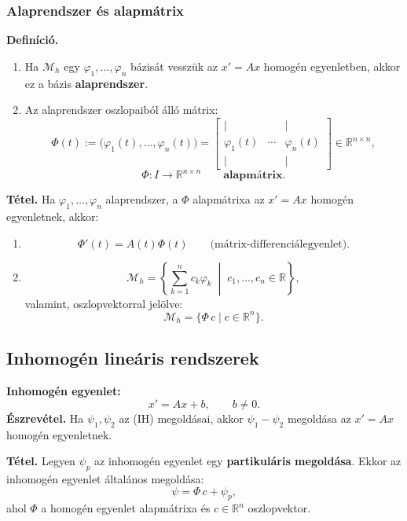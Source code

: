 \subsubsection*{Alaprendszer és alapmátrix}
\textbf{Definíció.}
\begin{enumerate}[label=\arabic*)]
\item Ha $\mathcal M_h$ egy $\varphi_1,\ldots,\varphi_n$ bázisát
vesszük az $x'=Ax$ homogén egyenletben, akkor ez a bázis
\textbf{alaprendszer}.
\item Az alaprendszer oszlopaiból álló mátrix:
\[
 \Phi(t):=\bigl(\varphi_1(t),\ldots,\varphi_n(t)\bigr)
 =\begin{bmatrix}\vert&&\vert\\
                   \varphi_1(t)&\cdots&\varphi_n(t)\\
                   \vert&&\vert\end{bmatrix}
 \in\mathbb R^{n\times n},
\]
\[
 \Phi:I\longrightarrow\mathbb R^{n\times n}
 \qquad\textbf{alapmátrix}.
\]
\end{enumerate}

\begin{matbox}
\textbf{Tétel.} Ha $\varphi_1,\ldots,\varphi_n$ alaprendszer,
a $\Phi$ alapmátrixa az $x'=Ax$ homogén egyenletnek, akkor:
\begin{enumerate}[label=\arabic*)]
\item
\[
 \Phi'(t)=A(t)\Phi(t)
 \qquad\text{(mátrix-differenciálegyenlet)}.
\]
\item
\[
 \mathcal M_h=\left\{\sum_{k=1}^{n}c_k\varphi_k
 \;\middle|\;c_1,\ldots,c_n\in\mathbb R\right\},
\]
valamint, oszlopvektorral jelölve:
\[
 \mathcal M_h=\{\Phi\,c\mid c\in\mathbb R^n\}.
\]
\end{enumerate}
\end{matbox}

\subsection{Inhomogén lineáris rendszerek}
\textbf{Inhomogén egyenlet:}
\[
 x'=Ax+b,\qquad b\ne0.\tag{IH}
\]
\textbf{Észrevétel.} Ha $\psi_1,\psi_2$ az (IH) megoldásai,
akkor $\psi_1-\psi_2$ megoldása az $x'=Ax$ homogén egyenletnek.

\textbf{Tétel.} Legyen $\psi_p$ az inhomogén egyenlet egy
\textbf{partikuláris megoldása}. Ekkor az inhomogén egyenlet
általános megoldása:
\[
 \psi=\Phi\,c+\psi_p,
\]
ahol $\Phi$ a homogén egyenlet alapmátrixa és
$c\in\mathbb R^n$ oszlopvektor.


